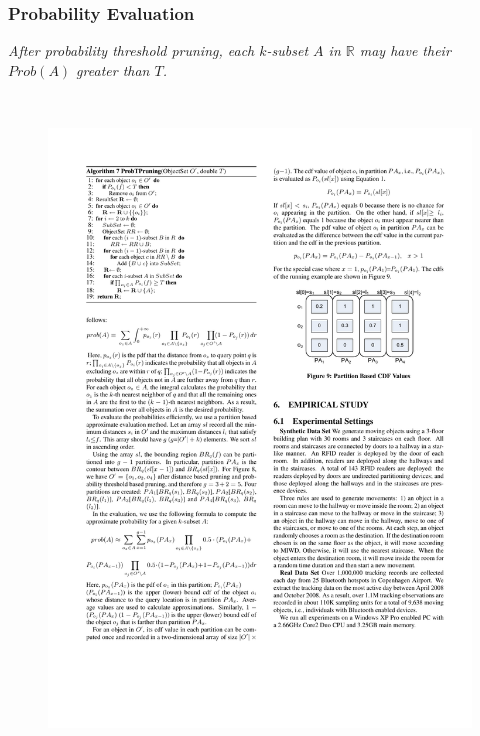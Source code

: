 
\begin{frame}
\frametitle{Probability Evaluation}

\textit{\textrm{After probability threshold pruning, each ${k}$-subset ${A}$ in $\mathbb{R}$ may have their ${Prob(A)}$ greater than ${T}$.}}
\\~\\
\begin{columns}[c]

    \begin{figure}[tb]
      \includegraphics[width=\columnwidth]{figures/2-3/2-3-10.pdf}
    \end{figure}


\end{columns}
\end{frame}
